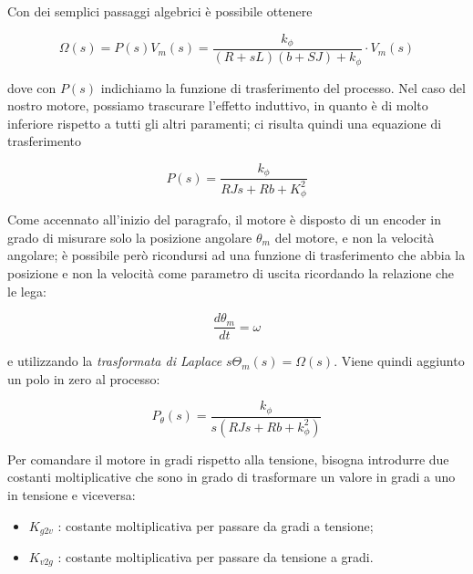 \documentclass[english]{article}
\begin{document}
		\noindent Con dei semplici passaggi algebrici è possibile ottenere
	
		\begin{equation}
			\Omega(s) = P(s)V_m(s) = \frac{k_{\phi}}{(R+sL)(b+SJ)+k_{\phi}}\cdot V_m(s)
			\label{eq:funzioneTrasferimento}
		\end{equation}
	
		\noindent dove con $P(s)$ indichiamo la funzione di trasferimento del processo. Nel caso del nostro motore, possiamo trascurare l'effetto induttivo, in quanto è di molto inferiore rispetto a tutti gli altri paramenti; ci risulta quindi una equazione di trasferimento
	
		\begin{equation}
			P(s) = \frac{k_{\phi}}{RJs + Rb +K_{\phi}^2}
			\label{eq:funzioneTrasferimentoSemplificata}
		\end{equation}
	
		\noindent Come accennato all'inizio del paragrafo, il motore è disposto di un encoder in grado di misurare solo la posizione angolare $\theta_m$ del motore, e non la velocità angolare; è possibile però ricondursi ad una funzione di trasferimento che abbia la posizione e non la velocità come parametro di uscita ricordando la relazione che le lega: 
	
		\begin{equation*}
			\frac{d\theta_m}{dt} = \omega
			\label{eq:posizioneVelocità}
		\end{equation*}
	
		\noindent e utilizzando la \textit{trasformata di Laplace} $s\Theta_m(s)=\Omega(s)$. Viene quindi aggiunto un polo in zero al processo:
	
		\begin{equation}
			P_{\theta}(s) = \frac{k_{\phi}}{s(RJs + Rb + k_{\phi}^2)}
			\label{eq:funzioneTrasferimentoMotoriduttore}
		\end{equation}
	
		\noindent Per comandare il motore in gradi rispetto alla tensione, bisogna introdurre due costanti moltiplicative che sono in grado di trasformare un valore in gradi a uno in tensione e viceversa:
	
		\begin{itemize}
			\item $K_{g2v}$ : costante moltiplicativa per passare da gradi a tensione;
			\item $K_{v2g}$ : costante moltiplicativa per passare da tensione a gradi.
			\label{item:costantiK} 
		\end{itemize}
	
\end{document}
